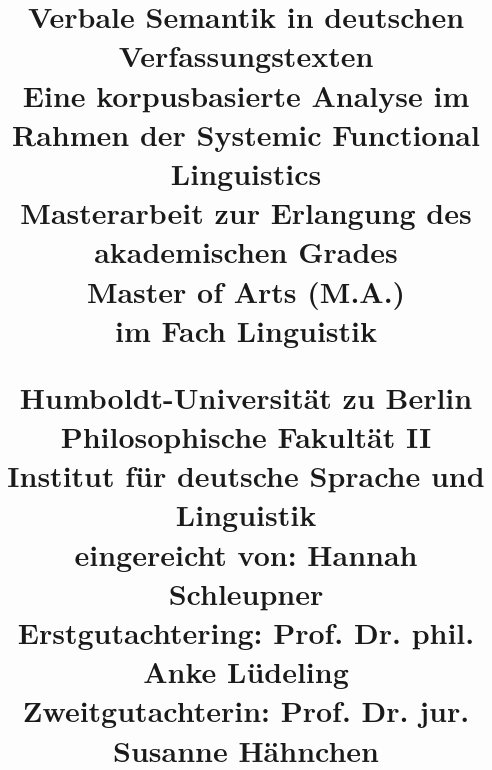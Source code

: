 \title{\LARGE
\textbf{Verbale Semantik in deutschen Verfassungstexten}\\
\medskip
Eine korpusbasierte Analyse im Rahmen der Systemic Functional Linguistics\\
\bigskip
\large Masterarbeit zur Erlangung des akademischen Grades\\Master of Arts (M.A.)\\ im Fach Linguistik\\
\vskip 1in
\raggedright Humboldt-Universität zu Berlin\\
Philosophische Fakultät II\\
Institut für deutsche Sprache und Linguistik\\
\vskip 1in
eingereicht von: Hannah Schleupner\\Erstgutachtering: Prof. Dr. phil. Anke Lüdeling\\Zweitgutachterin: Prof. Dr. jur. Susanne Hähnchen}

